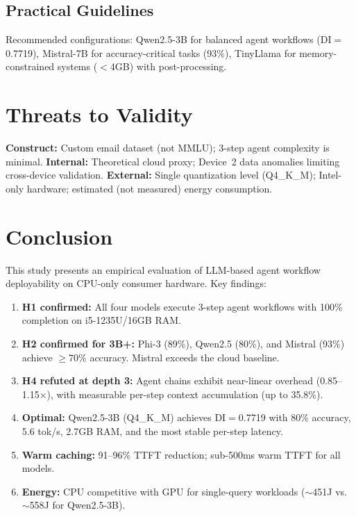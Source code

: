 \documentclass[conference]{IEEEtran}
\begin{document}
\subsection{Practical Guidelines}

Recommended configurations: Qwen2.5-3B for balanced agent workflows (DI$=$0.7719), Mistral-7B for accuracy-critical tasks (93\%), TinyLlama for memory-constrained systems ($<$4GB) with post-processing.

\section{Threats to Validity}

\textbf{Construct:} Custom email dataset (not MMLU); 3-step agent complexity is minimal.
\textbf{Internal:} Theoretical cloud proxy; Device~2 data anomalies limiting cross-device validation.
\textbf{External:} Single quantization level (Q4\_K\_M); Intel-only hardware; estimated (not measured) energy consumption.

\section{Conclusion}

This study presents an empirical evaluation of LLM-based agent workflow deployability on CPU-only consumer hardware. Key findings:

\begin{enumerate}
\item \textbf{H1 confirmed:} All four models execute 3-step agent workflows with 100\% completion on i5-1235U/16GB RAM.
\item \textbf{H2 confirmed for 3B+:} Phi-3 (89\%), Qwen2.5 (80\%), and Mistral (93\%) achieve $\geq$70\% accuracy. Mistral exceeds the cloud baseline.
\item \textbf{H4 refuted at depth 3:} Agent chains exhibit near-linear overhead (0.85--1.15$\times$), with measurable per-step context accumulation (up to 35.8\%).
\item \textbf{Optimal:} Qwen2.5-3B (Q4\_K\_M) achieves DI$=$0.7719 with 80\% accuracy, 5.6 tok/s, 2.7GB RAM, and the most stable per-step latency.
\item \textbf{Warm caching:} 91--96\% TTFT reduction; sub-500ms warm TTFT for all models.
\item \textbf{Energy:} CPU competitive with GPU for single-query workloads ($\sim$451J vs.\ $\sim$558J for Qwen2.5-3B).
\end{enumerate}
\end{document}
